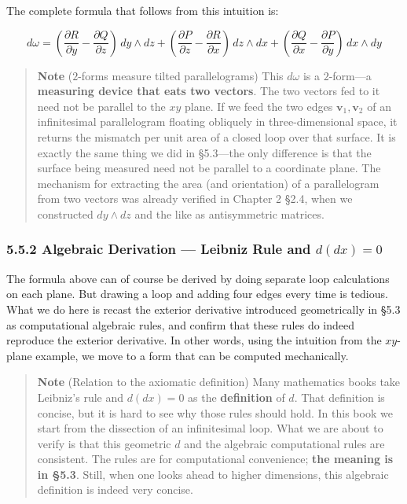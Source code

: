 The complete formula that follows from this intuition is:

\[d\omega = (\frac{\partial R}{\partial y} - \frac{\partial Q}{\partial z})\,dy \wedge dz + (\frac{\partial P}{\partial z} - \frac{\partial R}{\partial x})\,dz \wedge dx + (\frac{\partial Q}{\partial x} - \frac{\partial P}{\partial y})\,dx \wedge dy\]

\begin{quote}
\textbf{Note} (\(2\)-forms measure tilted parallelograms) This
\(d\omega\) is a \(2\)-form---a
\textbf{measuring device that eats two vectors}. The two vectors fed to
it need not be parallel to the \(xy\) plane. If we feed the two edges
\(\mathbf{v}_1, \mathbf{v}_2\) of an infinitesimal parallelogram
floating obliquely in three-dimensional space, it returns the mismatch
per unit area of a closed loop over that surface. It is exactly the same
thing we did in §5.3---the only difference is that the surface being
measured need not be parallel to a coordinate plane. The mechanism for
extracting the area (and orientation) of a parallelogram from two
vectors was already verified in Chapter 2 §2.4, when we constructed
\(dy \wedge dz\) and the like as antisymmetric matrices.
\end{quote}

\hypertarget{algebraic-derivation-leibniz-rule-and-ddx0}{%
\subsubsection{\texorpdfstring{5.5.2 Algebraic Derivation --- Leibniz
Rule and
\(d(dx)=0\)}{5.5.2 Algebraic Derivation --- Leibniz Rule and d(dx)=0}}\label{algebraic-derivation-leibniz-rule-and-ddx0}}

The formula above can of course be derived by doing separate loop
calculations on each plane. But drawing a loop and adding four edges
every time is tedious. What we do here is recast the exterior derivative
introduced geometrically in §5.3 as computational algebraic rules, and
confirm that these rules do indeed reproduce the exterior derivative. In
other words, using the intuition from the \(xy\)-plane example, we move
to a form that can be computed mechanically.

\begin{quote}
\textbf{Note} (Relation to the axiomatic definition) Many mathematics
books take Leibniz's rule and \(d(dx)=0\) as the \textbf{definition} of
\(d\). That definition is concise, but it is hard to see why those rules
should hold. In this book we start from the dissection of an
infinitesimal loop. What we are about to verify is that this geometric
\(d\) and the algebraic computational rules are consistent. The rules
are for computational convenience; \textbf{the meaning is in §5.3}.
Still, when one looks ahead to higher dimensions, this algebraic
definition is indeed very concise.
\end{quote}

